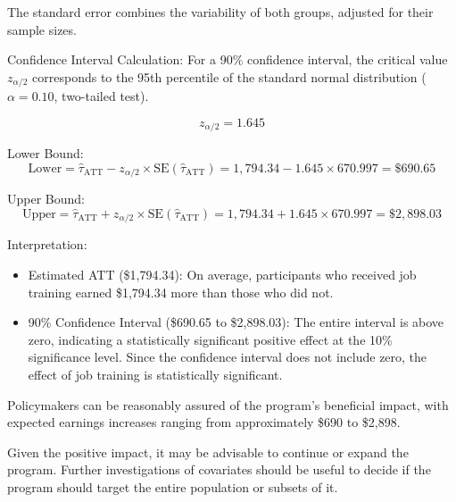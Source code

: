 \documentclass{article}
\begin{document}
The standard error combines the variability of both groups, adjusted for their sample sizes.

Confidence Interval Calculation:
For a 90\% confidence interval, the critical value \(z_{\alpha/2}\) corresponds to the 95th percentile of the standard normal distribution (\(\alpha = 0.10\), two-tailed test).

\[
z_{\alpha/2} = 1.645
\]

Lower Bound:
\[
\text{Lower} = \hat{\tau}_{\text{ATT}} - z_{\alpha/2} \times \text{SE}(\hat{\tau}_{\text{ATT}}) = 1,794.34 - 1.645 \times 670.997 = \$690.65
\]

Upper Bound:
\[
\text{Upper} = \hat{\tau}_{\text{ATT}} + z_{\alpha/2} \times \text{SE}(\hat{\tau}_{\text{ATT}}) = 1,794.34 + 1.645 \times 670.997 = \$2,898.03
\]

Interpretation:

\begin{itemize}
    \item Estimated ATT (\$1,794.34): On average, participants who received job training earned \$1,794.34 more than those who did not.
    \item 90\% Confidence Interval (\$690.65 to \$2,898.03): The entire interval is above zero, indicating a statistically significant positive effect at the 10\% significance level. Since the confidence interval does not include zero, the effect of job training is statistically significant.
\end{itemize}

Policymakers can be reasonably assured of the program's beneficial impact, with expected earnings increases ranging from approximately \$690 to \$2,898.

Given the positive impact, it may be advisable to continue or expand the program. Further investigations of covariates should be useful to decide if the program should target the entire population or subsets of it.
\end{document}
